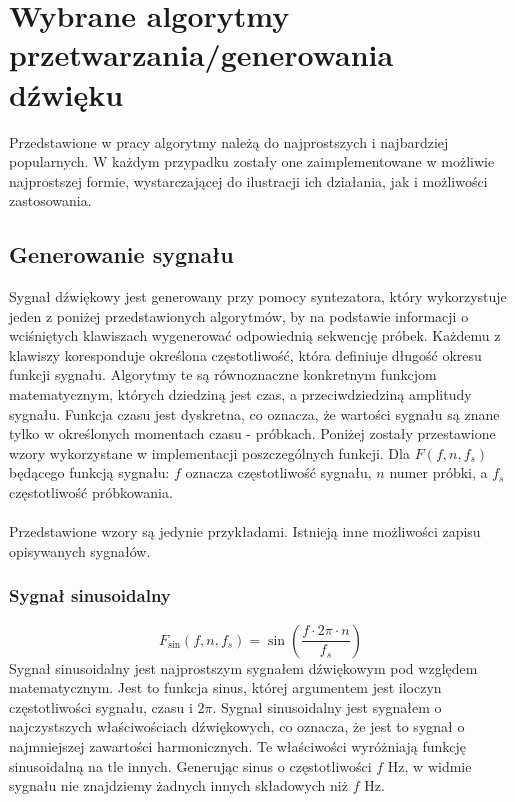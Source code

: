 \chapter{Wybrane algorytmy przetwarzania/generowania dźwięku}
Przedstawione w pracy algorytmy należą do najprostszych i najbardziej popularnych. W każdym przypadku zostały one zaimplementowane w możliwie najprostszej formie, wystarczającej do ilustracji ich działania, jak i możliwości zastosowania. 

\section{Generowanie sygnału}
Sygnał dźwiękowy jest generowany przy pomocy syntezatora, który wykorzystuje jeden z poniżej przedstawionych algorytmów, by na podstawie informacji o wciśniętych klawiszach wygenerować odpowiednią sekwencję próbek. Każdemu z klawiszy koresponduje określona częstotliwość, która definiuje długość okresu funkcji sygnału. Algorytmy te są równoznaczne konkretnym funkcjom matematycznym, których dziedziną jest czas, a przeciwdziedziną amplitudy sygnału. Funkcja czasu jest dyskretna, co oznacza, że wartości sygnału są znane tylko w określonych momentach czasu - próbkach. Poniżej zostały przestawione wzory wykorzystane w implementacji poszczególnych funkcji. Dla $F(f, n, f_s)$ będącego funkcją sygnału: $f$ oznacza częstotliwość sygnału, $n$ numer próbki, a $f_s$ częstotliwość próbkowania.
\\\\
Przedstawione wzory są jedynie przykładami. Istnieją inne możliwości zapisu opisywanych sygnałów.

\subsection{Sygnał sinusoidalny}
\newcommand{\Fsin}{F_{\text{sin}}}
\begin{equation}
    \Fsin(f, n, f_s) = \sin\left(\frac{f \cdot 2\pi \cdot n}{f_s}\right)
    \label{eq:sygnał sinusoidalny}
\end{equation}
\vspace{10pt}Sygnał sinusoidalny jest najprostszym sygnałem dźwiękowym pod względem matematycznym. Jest to funkcja sinus, której argumentem jest iloczyn częstotliwości sygnału, czasu i $2\pi$. Sygnał sinusoidalny jest sygnałem o najczystszych właściwościach dźwiękowych, co oznacza, że jest to sygnał o najmniejszej zawartości harmonicznych. Te właściwości wyróżniają funkcję sinusoidalną na tle innych. Generując sinus o częstotliwości $f$ Hz, w widmie sygnału nie znajdziemy żadnych innych składowych niż $f$ Hz.

